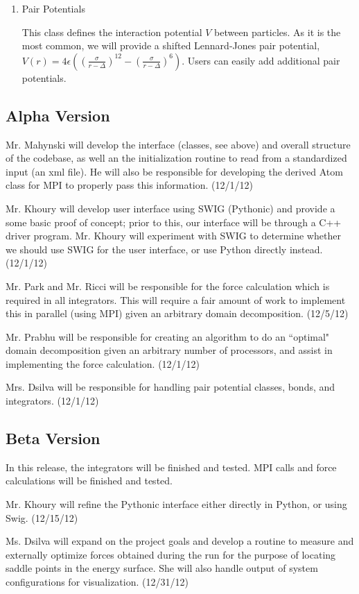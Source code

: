 \documentclass[10pt]{article}
\begin{document}
\begin{enumerate}
	\item{Pair Potentials} \par This class defines the interaction potential $V$ between particles. As it is the most common, we will provide a shifted Lennard-Jones pair potential, $V(r) = 4\epsilon \left( \left( \frac{\sigma}{r-\Delta} \right)^{12} - \left( \frac{\sigma}{r - \Delta} \right)^{6} \right)$. Users can easily add additional pair potentials.
\end{enumerate}

\subsection{Alpha Version}
Mr. Mahynski will develop the interface (classes, see above) and overall structure of the codebase, as well an the initialization routine to read from a standardized input (an xml file).  He will also be responsible for developing the derived Atom class for MPI to properly pass this information. (12/1/12)

Mr. Khoury will develop user interface using SWIG (Pythonic) and provide a some basic proof of concept; prior to this, our interface will be through a C++ driver program. Mr. Khoury will experiment with SWIG to determine whether we should use SWIG for the user interface, or use Python directly instead. (12/1/12)

Mr. Park and Mr. Ricci will be responsible for the force calculation which is required in all integrators.  This will require a fair amount of work to implement this in parallel (using MPI) given an arbitrary domain decomposition. (12/5/12)

Mr. Prabhu will be responsible for creating an algorithm to do an ``optimal" domain decomposition given an arbitrary number of processors, and assist in implementing the force calculation.  (12/1/12)

Mrs. Dsilva will be responsible for handling pair potential classes, bonds, and integrators.  (12/1/12)

\subsection{Beta Version}
In this release, the integrators will be finished and tested.  MPI calls and force calculations will be finished and tested.

Mr. Khoury will refine the Pythonic interface either directly in Python, or using Swig.  (12/15/12)

Ms. Dsilva will expand on the project goals and develop a routine to measure and externally optimize forces obtained during the run for the purpose of locating saddle points in the energy surface.  She will also handle output of system configurations for visualization.  (12/31/12)
\end{document}
